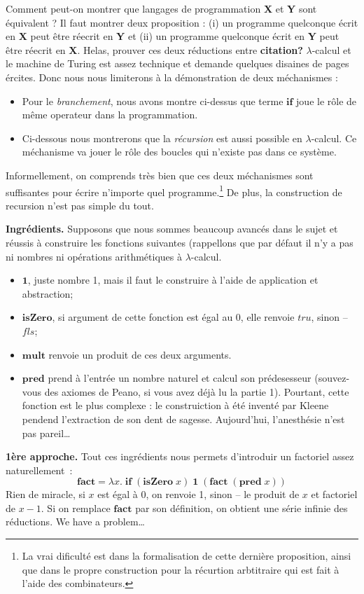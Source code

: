 \documentclass[12pt, a4paper]{article}
\begin{document}
Comment peut-on montrer que langages de programmation \textbf{X} et \textbf{Y} sont équivalent ?
Il faut montrer deux proposition : (i) un programme quelconque écrit en \textbf{X} peut être réecrit en \textbf{Y} et (ii) un programme quelconque écrit en \textbf{Y} peut être réecrit en \textbf{X}.
Helas, prouver ces deux réductions entre \textbf{citation?} $\lambda$-calcul et le machine de Turing est assez technique et demande quelques disaines de pages ércites.
Donc nous nous limiterons à la démonstration de deux méchanismes :
\begin{itemize}
	\item Pour le \emph{branchement}, nous avons montre ci-dessus que terme $\mathbf{if}$ joue le rôle de même operateur dans la programmation.
	\item Ci-dessous nous montrerons que la \emph{récursion} est aussi possible en $\lambda$-calcul. Ce méchanisme va jouer le rôle des boucles qui n'existe pas dans ce système.
\end{itemize}
Informellement, on comprends très bien que ces deux méchanismes sont suffisantes pour écrire n'importe quel programme.\footnote{La vrai dificulté est dans la formalisation de cette dernière proposition, ainsi que dans le propre construction pour la récurtion arbtitraire qui est fait à l'aide des combinateurs.}
De plus, la construction de recursion n'est pas simple du tout.

\textbf{Ingrédients.} Supposons que nous sommes beaucoup avancés dans le sujet et réussis à construire les fonctions suivantes (rappellons que par défaut il n'y a pas ni nombres ni opérations arithmétiques à $\lambda$-calcul.
\begin{itemize}
	\item $\mathbf{1}$, juste nombre 1, mais il faut le construire à l'aide de application et abstraction;
	\item $\mathbf{isZero}$, si argument de cette fonction est égal au 0, elle renvoie $tru$, sinon -- $fls$;
	\item $\mathbf{mult}$ renvoie un produit de ces deux arguments.
	\item $\mathbf{pred}$ prend à l'entrée un nombre naturel et calcul son prédesesseur (souvez-vous des axiomes de Peano, si vous avez déjà lu la partie 1). Pourtant, cette fonction est le plus complexe : le construiction à été inventé par Kleene pendend l'extraction de son dent de sagesse. Aujourd'hui, l'anesthésie n'est pas pareil\ldots
\end{itemize}
\textbf{1ère approche.}
Tout ces ingrédients nous permets d'introduir un factoriel assez naturellement~:
$$\mathbf{fact} = \lambda x. \; \mathbf{if} \; (\mathbf{isZero} \; x) \; \mathbf{1} \; (\mathbf{fact} \; (\mathbf{pred} \; x))$$
Rien de miracle, si $x$ est égal à 0, on renvoie 1, sinon -- le produit de $x$ et factoriel de $x-1$.
Si on remplace $\mathbf{fact}$ par son définition, on obtient une série infinie des réductions. We have a problem\ldots
\end{document}
